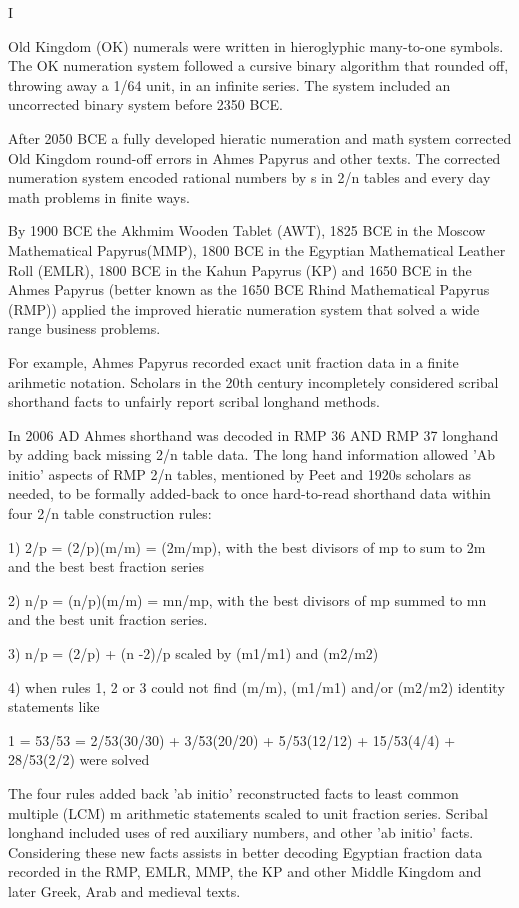 \documentclass[12pt]{article}
\begin{document}
I 

Old Kingdom (OK) numerals were written in hieroglyphic many-to-one symbols. The OK numeration system followed a cursive binary algorithm that rounded off, throwing away a 1/64 unit, in an infinite series. The system included an uncorrected binary system before 2350 BCE. 

After 2050 BCE a fully developed hieratic numeration and math system corrected Old Kingdom round-off errors in Ahmes Papyrus and other texts. The corrected numeration system encoded rational numbers by s in 2/n tables and every day math problems in finite ways. 

By 1900 BCE the Akhmim Wooden Tablet (AWT), 1825 BCE in the Moscow Mathematical Papyrus(MMP), 1800 BCE in the Egyptian Mathematical Leather Roll (EMLR), 1800 BCE in the Kahun Papyrus (KP) and 1650 BCE in the Ahmes Papyrus (better known as the 1650 BCE Rhind Mathematical Papyrus (RMP)) applied the improved hieratic numeration system that solved a wide range business problems.

For example, Ahmes Papyrus recorded exact unit fraction data in a finite arihmetic notation. Scholars in the 20th century incompletely considered scribal shorthand facts to unfairly report scribal longhand methods.  

In 2006 AD Ahmes shorthand was decoded in RMP 36 AND RMP 37 longhand by adding back missing 2/n table data. The long hand information allowed 'Ab initio' aspects of RMP 2/n tables, mentioned by Peet and 1920s scholars as needed, to be formally added-back to once hard-to-read shorthand data within four 2/n table construction rules:

1) 2/p = (2/p)(m/m) = (2m/mp), with the best divisors of mp to sum to 2m and the best best fraction series 

2) n/p = (n/p)(m/m) = mn/mp, with the best divisors of mp summed to mn and the best unit fraction series.

3) n/p = (2/p) + (n -2)/p scaled by (m1/m1) and (m2/m2)

4) when rules 1, 2 or 3 could not find (m/m), (m1/m1) and/or (m2/m2) identity statements like 

1 = 53/53 = 2/53(30/30) + 3/53(20/20) + 5/53(12/12) + 15/53(4/4) + 28/53(2/2) were solved

The four rules  added back 'ab initio' reconstructed facts to least common multiple (LCM) m arithmetic statements scaled to unit fraction series. Scribal longhand included uses of red auxiliary numbers, and other 'ab initio' facts. Considering these new facts assists in better decoding Egyptian fraction data recorded in the RMP, EMLR, MMP, the KP and other Middle Kingdom and later Greek, Arab and medieval texts.
\end{document}

